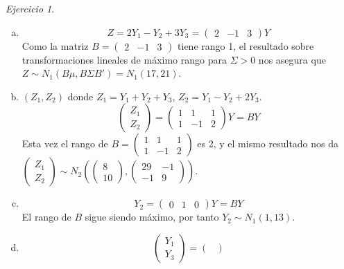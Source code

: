 \documentclass[12pt,spanish]{article}
\theoremstyle{definition}
\theoremstyle{remark}
\newtheorem{exercise}{Ejercicio}
\begin{document}
\begin{exercise}
  \begin{enumerate}[a)]
  \item \[Z=2Y_1-Y_2+3Y_3=
      \begin{pmatrix}
        2 & -1 & 3
      \end{pmatrix}
      Y
    \]
    Como la matriz $B=\begin{pmatrix}
        2 & -1 & 3
      \end{pmatrix}$ tiene rango 1, el resultado sobre
      transformaciones lineales de máximo rango para $\Sigma>0$ nos
      asegura que $Z\sim N_1(B\mu,B\Sigma B')=N_1(17,21)$.
    \item $(Z_1,Z_2)$ donde $Z_1=Y_1+Y_2+Y_3$, $Z_2=Y_1-Y_2+2Y_3$.
      \[\begin{pmatrix}
          Z_1 \\
          Z_2
        \end{pmatrix}
        =\begin{pmatrix}
          1 & 1 & 1 \\
          1 & -1 & 2
        \end{pmatrix}Y=BY
      \]
      Esta vez el rango de $B=\begin{pmatrix}
          1 & 1 & 1 \\
          1 & -1 & 2
        \end{pmatrix}$ es 2, y el mismo resultado nos da \\ $\begin{pmatrix}
          Z_1 \\
          Z_2
        \end{pmatrix}\sim N_2\left(
        \begin{pmatrix}
          8 \\ 10
        \end{pmatrix},
        \begin{pmatrix}
          29 & -1 \\
          -1 & 9
        \end{pmatrix}\right)$.
      \item \[Y_2=
      \begin{pmatrix}
        0 & 1 & 0
      \end{pmatrix}
      Y=BY
    \]
    El rango de $B$ sigue siendo máximo, por tanto $Y_2\sim N_1(1,13)$.
    \item \[\begin{pmatrix}
          Y_1 \\
          Y_3
        \end{pmatrix}
        =\begin{pmatrix}

\end{pmatrix}\]
\end{enumerate}
\end{exercise}
\end{document}
